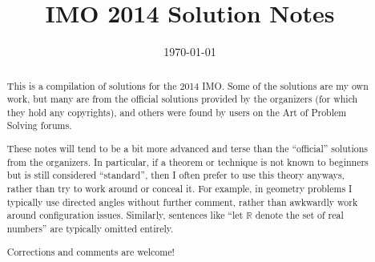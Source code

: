 \documentclass[11pt]{scrartcl}
\title{IMO 2014 Solution Notes}
\date{\today}
\begin{document}
\maketitle

\begin{abstract}
This is a compilation of solutions
for the 2014 IMO.
Some of the solutions are my own work,
but many are from the official solutions provided by the organizers
(for which they hold any copyrights),
and others were found by users on the Art of Problem Solving forums.

These notes will tend to be a bit more advanced and terse than the ``official''
solutions from the organizers.
In particular, if a theorem or technique is not known to beginners
but is still considered ``standard'', then I often prefer to
use this theory anyways, rather than try to work around or conceal it.
For example, in geometry problems I typically use directed angles
without further comment, rather than awkwardly work around configuration issues.
Similarly, sentences like ``let $\mathbb{R}$ denote the set of real numbers''
are typically omitted entirely.

Corrections and comments are welcome!
\end{abstract}

\tableofcontents
\newpage

\addtocounter{section}{-1}
\end{document}
